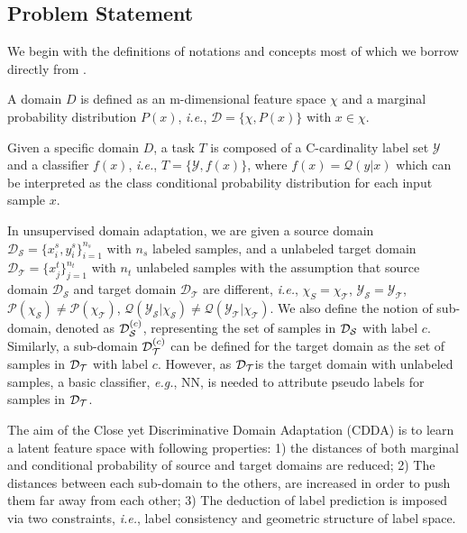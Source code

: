 \documentclass[10pt,twocolumn,letterpaper]{article}
\newcommand\luo[1]{{\footnotesize \color{blue}[#1 - \textbf{Luo}]}}
\begin{document}
\begin{CJK*}{UTF8}{gkai}
\subsection{Problem Statement}
We begin with the definitions of notations and concepts most of which we borrow directly  from \cite{long2013transfer}. 

A domain $D$ is defined as an m-dimensional feature space $\chi$ and a marginal probability distribution $P(x)$, \textit{i.e.}, $\mathcal{D}=\{\chi,P(x)\}$ with $x\in \chi$. 

Given a specific domain $D$, a  task $T$ is composed of a C-cardinality label set $\mathcal{Y}$  and a classifier $f(x)$,\textit{ i.e.}, $T = \{\mathcal{Y},f(x)\}$, where $f({x}) = \mathcal{Q}( y |x)$ which can be interpreted as the class conditional probability distribution for each input sample $x$. 
% 
% 

In unsupervised domain adaptation, we are given a source domain $\mathcal{D_S}=\{x_{i}^{s},y_{i}^{s}\}_{i=1}^{n_s}$ with $n_s$ labeled samples, and  a unlabeled target domain $\mathcal{D_T}=\{x_{j}^{t}\}_{j=1}^{n_t}$ with $n_t$  unlabeled samples with the assumption that source domain $\mathcal{D_S}$ and target domain $\mathcal{D_T}$ are different, \textit{i.e.},  $\mathcal{\chi}_S=\mathcal{{\chi}_T}$, $\mathcal{Y_S}=\mathcal{Y_T}$, $\mathcal{P}(\mathcal{\chi_S}) \neq \mathcal{P}(\mathcal{\chi_T})$, $\mathcal{Q}(\mathcal{Y_S}|\mathcal{\chi_{S}}) \neq \mathcal{Q}(\mathcal{Y_T}|\mathcal{\chi_{T}})$.
We also define the notion of sub-domain, denoted as ${\cal D}_{\cal S}^{(c)}$, representing the set of samples in ${{\cal D}_{\cal S}}$ with label $c$. Similarly, a sub-domain ${\cal D}_{\cal T}^{(c)}$ can be defined for the target domain as the set of samples in ${{\cal D}_{\cal T}}$ with label $c$. However, as ${{\cal D}_{\cal T}}$is the target domain with unlabeled samples, a basic classifier,\textit{ e.g.}, NN, is needed to attribute  pseudo labels for samples in ${{\cal D}_{\cal T}}$.

The aim of the Close yet Discriminative Domain Adaptation (CDDA) is to learn a latent feature space with following properties: 1) the distances of both marginal and conditional probability of source and target domains are reduced; 2)  The distances between each sub-domain to the others,  are increased in order to  push them far away from each other; 3) The deduction of  label prediction is imposed via  two constraints, \textit{i.e.},  label consistency and geometric structure of label space.


\end{CJK*}
\end{document}
